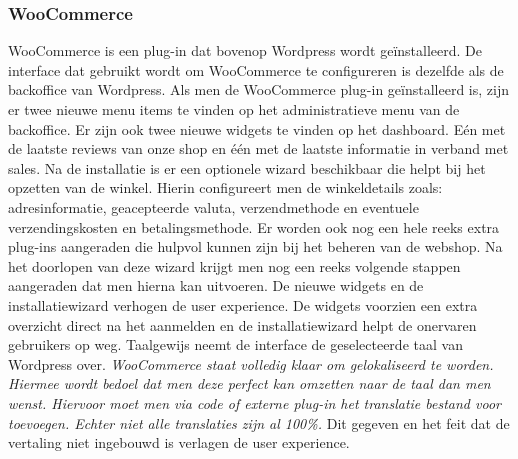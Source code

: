 \subsubsection{WooCommerce}
WooCommerce is een plug-in dat bovenop Wordpress wordt geïnstalleerd. De interface dat gebruikt wordt om WooCommerce te configureren is dezelfde als de backoffice van Wordpress. Als men de WooCommerce plug-in geïnstalleerd is, zijn er twee nieuwe menu items te vinden op het administratieve menu van de backoffice. Er zijn ook twee nieuwe widgets te vinden op het dashboard. Eén met de laatste reviews van onze shop en één met de laatste informatie in verband met sales. Na de installatie is er een optionele wizard beschikbaar die helpt bij het opzetten van de winkel. Hierin configureert men de winkeldetails zoals: adresinformatie, geacepteerde valuta, verzendmethode en eventuele verzendingskosten en betalingsmethode. Er worden ook nog een hele reeks extra plug-ins aangeraden die hulpvol kunnen zijn bij het beheren van de webshop. Na het doorlopen van deze wizard krijgt men nog een reeks volgende stappen aangeraden dat men hierna kan uitvoeren. De nieuwe widgets en de installatiewizard verhogen de user experience. De widgets voorzien een extra overzicht direct na het aanmelden en de installatiewizard helpt de onervaren gebruikers op weg. Taalgewijs neemt de interface de geselecteerde taal van Wordpress over. \textit{WooCommerce staat volledig klaar om gelokaliseerd te worden. Hiermee wordt bedoel dat men deze perfect kan omzetten naar de taal dan men wenst. Hiervoor moet men via code of externe plug-in het translatie bestand voor toevoegen. Echter niet alle translaties zijn al 100\%.}\autocite{WooCommerce2019} Dit gegeven en het feit dat de vertaling niet ingebouwd is verlagen de user experience.
